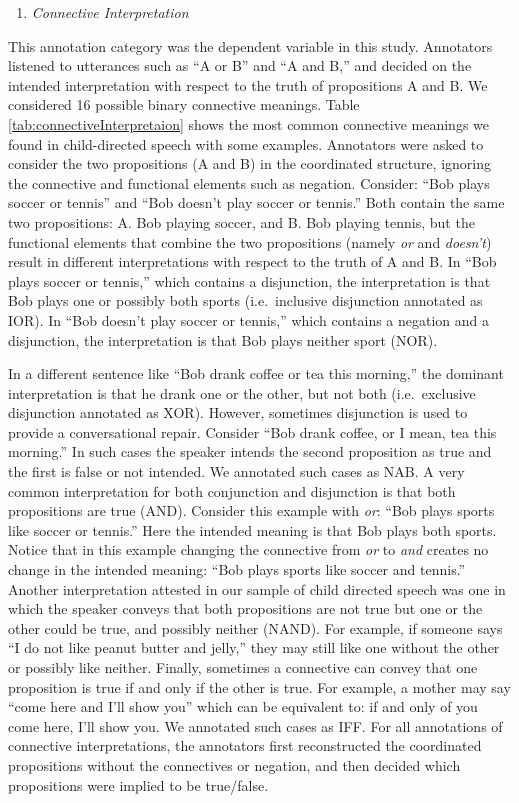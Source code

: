 \documentclass[
  english,
  ,man,floatsintext]{apa6}
\providecommand{\tightlist}{%
  \setlength{\itemsep}{0pt}\setlength{\parskip}{0pt}}
\begin{document}
\begin{enumerate}
\def\labelenumi{\arabic{enumi}.}
\tightlist
\item
  \emph{Connective Interpretation}
\end{enumerate}

This annotation category was the dependent variable in this study. Annotators listened to utterances such as ``A or B'' and ``A and B,'' and decided on the intended interpretation with respect to the truth of propositions A and B. We considered 16 possible binary connective meanings. Table \ref{tab:connectiveInterpretaion} shows the most common connective meanings we found in child-directed speech with some examples. Annotators were asked to consider the two propositions (A and B) in the coordinated structure, ignoring the connective and functional elements such as negation. Consider: ``Bob plays soccer or tennis'' and ``Bob doesn't play soccer or tennis.'' Both contain the same two propositions: A. Bob playing soccer, and B. Bob playing tennis, but the functional elements that combine the two propositions (namely \emph{or} and \emph{doesn't}) result in different interpretations with respect to the truth of A and B. In ``Bob plays soccer or tennis,'' which contains a disjunction, the interpretation is that Bob plays one or possibly both sports (i.e.~inclusive disjunction annotated as IOR). In ``Bob doesn't play soccer or tennis,'' which contains a negation and a disjunction, the interpretation is that Bob plays neither sport (NOR).

In a different sentence like ``Bob drank coffee or tea this morning,'' the dominant interpretation is that he drank one or the other, but not both (i.e.~exclusive disjunction annotated as XOR). However, sometimes disjunction is used to provide a conversational repair. Consider ``Bob drank coffee, or I mean, tea this morning.'' In such cases the speaker intends the second proposition as true and the first is false or not intended. We annotated such cases as NAB. A very common interpretation for both conjunction and disjunction is that both propositions are true (AND). Consider this example with \emph{or}: ``Bob plays sports like soccer or tennis.'' Here the intended meaning is that Bob plays both sports. Notice that in this example changing the connective from \emph{or} to \emph{and} creates no change in the intended meaning: ``Bob plays sports like soccer and tennis.'' Another interpretation attested in our sample of child directed speech was one in which the speaker conveys that both propositions are not true but one or the other could be true, and possibly neither (NAND). For example, if someone says ``I do not like peanut butter and jelly,'' they may still like one without the other or possibly like neither. Finally, sometimes a connective can convey that one proposition is true if and only if the other is true. For example, a mother may say ``come here and I'll show you'' which can be equivalent to: if and only of you come here, I'll show you. We annotated such cases as IFF. For all annotations of connective interpretations, the annotators first reconstructed the coordinated propositions without the connectives or negation, and then decided which propositions were implied to be true/false.
\end{document}
